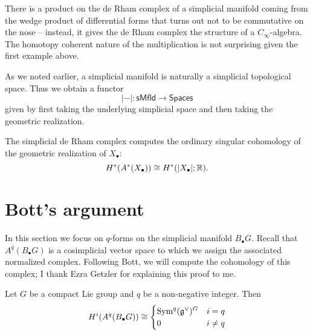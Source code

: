 \documentclass{amsart}
\begin{document}
\begin{remark}
    There is a product on the de Rham complex of a simplicial manifold
    coming from the wedge product of differential forms that 
    turns out not to be commutative on the nose -- instead, it gives the de
    Rham complex the structure of a $C_\infty$-algebra. The homotopy coherent 
    nature of the multiplication is not surprising given the first example 
    above.
\end{remark}

As we noted earlier, a simplicial manifold is naturally a simplicial topological 
space. Thus we obtain a functor
\begin{equation*}
    |-| : \mathsf{sMfld} \to \mathsf{Spaces}
\end{equation*}
given by first taking the underlying simplicial space and then taking the 
geometric realization.

\begin{theorem}
    The simplicial de Rham complex computes the ordinary singular cohomology of 
    the geometric realization of $X_\bullet$:
    \begin{equation*}
        H^*(A^*(X_\bullet)) \cong H^*(|X_\bullet|; \mathbb{R}).
    \end{equation*}
\end{theorem}

\section{Bott's argument}

In this section we focus on $q$-forms on the simplicial manifold $B_\bullet G$.
Recall that $A^q(B_\bullet G)$ is a cosimplicial vector space to which we
assign the associated normalized complex. Following Bott, we will compute the 
cohomology of this complex; I thank Ezra Getzler for explaining this proof
to me.

\begin{theorem}[Bott '73]
    Let $G$ be a compact Lie group and $q$ be a non-negative integer.
    Then
    \begin{equation*}
        H^i(A^q(B_\bullet G)) \cong
        \begin{cases}
            \operatorname{Sym}^q(\mathfrak g^\vee)^G & i=q \\
            0 & i\neq q
        \end{cases}
    \end{equation*}
\end{theorem}
\end{document}

